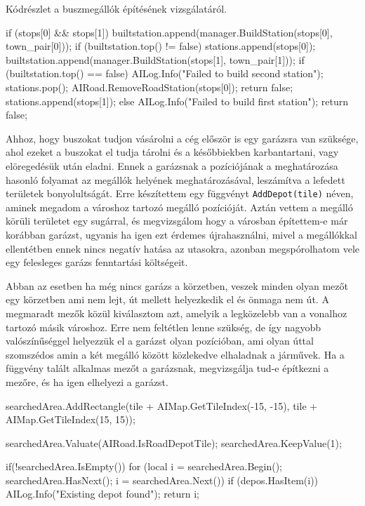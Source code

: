 Kódrészlet a buszmegállók építésének vizsgálatáról.
\begin{cpp}
if (stops[0] && stops[1]) {
  builtstation.append(manager.BuildStation(stops[0], town_pair[0]));
  if (builtstation.top() != false) {
    stations.append(stops[0]);
    builtstation.append(manager.BuildStation(stops[1], town_pair[1]));
    if (builtstation.top() == false) {
      AILog.Info("Failed to build second station");
      stations.pop();
      AIRoad.RemoveRoadStation(stops[0]);
      return false;
    }
    stations.append(stops[1]);
  } else {
    AILog.Info("Failed to build first station");
    return false;
  }
} 
\end{cpp}

Ahhoz, hogy buszokat tudjon vásárolni a cég először is egy garázsra van szüksége, ahol ezeket a buszokat el tudja tárolni és a későbbiekben karbantartani, vagy elöregedésük után eladni. Ennek a garázsnak a pozíciójának a meghatározása hasonló folyamat az megállók helyének meghatározásával, leszámítva a lefedett területek bonyolultságát. Erre készítettem egy függvényt \texttt{AddDepot(tile)} néven, aminek megadom a városhoz tartozó megálló pozícióját. Aztán vettem a megálló körüli területet egy sugárral, és megvizsgálom hogy a városban építettem-e már korábban garázst, ugyanis ha igen ezt érdemes újrahasználni, mivel a megállókkal ellentétben ennek nincs negatív hatása az utasokra, azonban megspórolhatom vele egy felesleges garázs fenntartási költségeit.

Abban az esetben ha még nincs garázs a körzetben, veszek minden olyan mezőt egy körzetben ami nem lejt, út mellett helyezkedik el és önmaga nem út. A megmaradt mezők közül kiválasztom azt, amelyik a legközelebb van a vonalhoz tartozó másik városhoz. Erre nem feltétlen lenne szükség, de így nagyobb valószínűséggel helyezzük el a garázst olyan pozícióban, ami olyan úttal szomszédos amin a két megálló között közlekedve elhaladnak a járművek. Ha a függvény talált alkalmas mezőt a garázsnak, megvizsgálja tud-e építkezni a mezőre, és ha igen elhelyezi a garázst.

\begin{cpp}
searchedArea.AddRectangle(tile + AIMap.GetTileIndex(-15, -15),
 tile + AIMap.GetTileIndex(15, 15));

searchedArea.Valuate(AIRoad.IsRoadDepotTile);
searchedArea.KeepValue(1);

if(!searchedArea.IsEmpty()) {
  for (local i = searchedArea.Begin(); 
   searchedArea.HasNext(); i = searchedArea.Next()) {
    if (depos.HasItem(i)) {
      AILog.Info("Existing depot found");
      return i;
    }
  }
}
\end{cpp}

